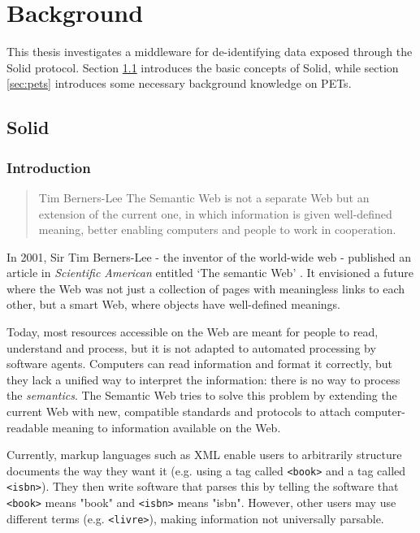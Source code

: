 \chapter{Background}
\label{cha:background}
This thesis investigates a middleware for de-identifying data exposed through the Solid protocol. Section \ref{sec:solid} introduces the basic concepts of Solid, while section \ref{sec:pets} introduces some necessary background knowledge on \gls{PETs}.

\section{Solid}
\label{sec:solid}

\subsection{Introduction}
\begin{quote}{Tim Berners-Lee}
    The Semantic Web is not a separate Web but an extension of the current one, in which information is given well-defined meaning, better enabling computers and people to work in cooperation.
\end{quote}

\noindent In 2001, Sir Tim Berners-Lee - the inventor of the world-wide web - published an article in \textit{Scientific American} entitled `The semantic Web' \citep{semantic-web}. It envisioned a future where the Web was not just a collection of pages with meaningless links to each other, but a smart Web, where objects have well-defined meanings.

Today, most resources accessible on the Web are meant for people to read, understand and process, but it is not adapted to automated processing by software agents. Computers can read information and format it correctly, but they lack a unified way to interpret the information: there is no way to process the \textit{semantics}. The Semantic Web tries to solve this problem by extending the current Web with new, compatible standards and protocols to attach computer-readable meaning to information available on the Web.

Currently, markup languages such as XML enable users to arbitrarily structure documents the way they want it (e.g. using a tag called \texttt{<book>} and a tag called \texttt{<isbn>}). They then write software that parses this by telling the software that \texttt{<book>} means "book" and \texttt{<isbn>} means "isbn". However, other users may use different terms (e.g. \texttt{<livre>}), making information not universally parsable. 

